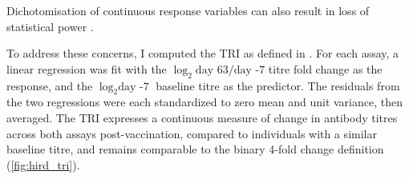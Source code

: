Dichotomisation of continuous response variables can also result in loss of statistical power \autocite{cohen1983CostDichotomization, fedorov2009ConsequencesDichotomization}.

To address these concerns, I computed the \gls{TRI} as defined in \textcite{bucasas2011EarlyPatternsGene}.
For each assay, a linear regression was fit with the $\log_2{\text{day 63}/\text{day -7}}$ titre fold change as the response, and the $\log_2{\text{day -7}}$ baseline titre as the predictor.
The residuals from the two regressions were each standardized to zero mean and unit variance, then averaged.
The \gls{TRI} expresses a continuous measure of change in antibody titres across both assays post-vaccination, compared to individuals with a similar baseline titre, and remains comparable to the binary 4-fold change definition (\autoref{fig:hird_tri}).

